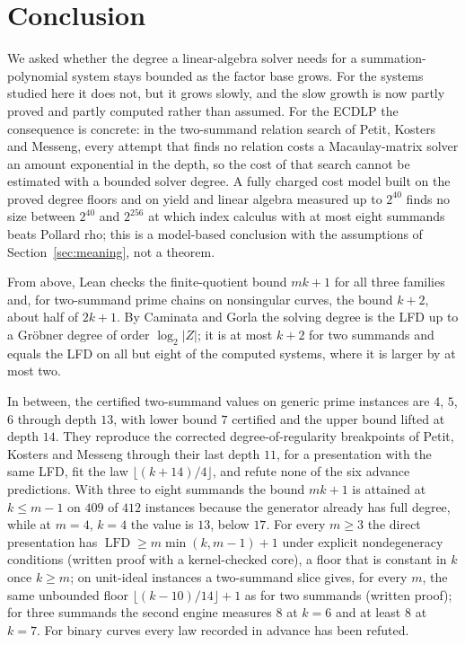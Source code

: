 \documentclass[11pt]{article}
\theoremstyle{definition}\newtheorem{definition}[theorem]{Definition}
\theoremstyle{remark}\newtheorem{remark}[theorem]{Remark}
\newcommand{\lfd}{\operatorname{LFD}}
\begin{document}
\section{Conclusion}\label{sec:conclusion}
We asked whether the degree a linear-algebra solver needs for a
summation-polynomial system stays bounded as the factor base grows. For the
systems studied here it does not, but it grows slowly, and the slow growth is
now partly proved and partly computed rather than assumed. For the ECDLP the
consequence is concrete: in the two-summand relation search of Petit,
Kosters and Messeng, every attempt that finds no relation costs a
Macaulay-matrix solver an amount exponential in the depth, so the cost of
that search cannot be estimated with a bounded solver degree. A fully
charged cost model built on the proved degree floors and on yield and linear
algebra measured up to $2^{40}$ finds no size between $2^{40}$ and $2^{256}$
at which index calculus with at most eight summands beats Pollard rho; this
is a model-based conclusion with the assumptions of Section~\ref{sec:meaning},
not a theorem.

From above, Lean checks the finite-quotient bound $mk+1$ for all three
families and, for two-summand prime chains on nonsingular curves, the bound
$k+2$, about half of $2k+1$. By Caminata and Gorla the solving degree is the
LFD up to a Gr\"obner degree of order $\log_2|Z|$; it is at most $k+2$ for two
summands and equals the LFD on all but eight of the computed systems, where it
is larger by at most two.

In between, the certified two-summand values on generic prime instances are
$4$, $5$, $6$ through depth $13$, with lower bound $7$ certified and the upper
bound lifted at depth $14$. They reproduce the corrected
degree-of-regularity breakpoints of Petit, Kosters and Messeng through their
last depth $11$, for a presentation with the same LFD, fit the law
$\lfloor(k+14)/4\rfloor$, and refute none of the six advance predictions.
With three to eight summands the bound $mk+1$ is attained at $k\le m-1$ on
$409$ of $412$ instances because the generator already has full degree, while
at $m=4$, $k=4$ the value is $13$, below $17$. For every $m\ge3$ the
direct presentation has $\lfd\ge m\min(k,m-1)+1$ under explicit
nondegeneracy conditions (written proof with a kernel-checked core), a
floor that is constant in $k$ once $k\ge m$; on unit-ideal instances a
two-summand slice gives, for every $m$, the same unbounded floor
$\lfloor(k-10)/14\rfloor+1$ as for two summands (written proof); for three summands the
second engine measures $8$ at $k=6$ and at least $8$ at $k=7$. For binary curves every law
recorded in advance has been refuted.
\end{document}
